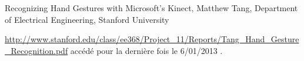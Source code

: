 \begin{thebibliography}{9}


Recognizing Hand Gestures with Microsoft's Kinect, Matthew Tang, Department of Electrical Engineering, Stanford University

\url{http://www.stanford.edu/class/ee368/Project_11/Reports/Tang_Hand_Gesture_Recognition.pdf} accédé pour la dernière fois le 6/01/2013 .



\end{thebibliography}